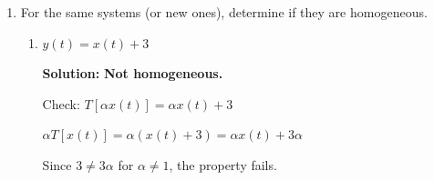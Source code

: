 \documentclass[nohyper,nobib,xcolor=dvipsnames,svgnames,x11names]{tufte-book}
\begin{document}
\begin{enumerate}
\begin{enumerate}
\textbf{Solution:} \textbf{Not additive.} 

Check: $T[x_1(t) + x_2(t)] = (x_1(t) + x_2(t)) + 3$


$T[x_1(t)] + T[x_2(t)] = (x_1(t) + 3) + (x_2(t) + 3) = x_1(t) + x_2(t) + 6$

Since $3 \neq 6$, the property fails.

\item $y(t) = t \cdot x(t)$

\textbf{Solution:} \textbf{Additive.}

Check: $T[x_1(t) + x_2(t)] = t \cdot (x_1(t) + x_2(t)) = t x_1(t) + t x_2(t)$

$T[x_1(t)] + T[x_2(t)] = t x_1(t) + t x_2(t)$

They are equal, so the system is additive.

\item  $y(t) = x(2t)$

\textbf{Solution:} \textbf{Additive.}

Check: $T[x_1(t) + x_2(t)] = (x_1 + x_2)(2t) = x_1(2t) + x_2(2t)$

$T[x_1(t)] + T[x_2(t)] = x_1(2t) + x_2(2t)$

They are equal, so the system is additive.


\item $y(t) = (x(t))^2$

\textbf{Solution:} \textbf{Not additive.}

Check: $T[x_1(t) + x_2(t)] = (x_1(t) + x_2(t))^2 = x_1^2(t) + 2x_1(t)x_2(t) + x_2^2(t)$

$T[x_1(t)] + T[x_2(t)] = x_1^2(t) + x_2^2(t)$ 

Since $2x_1(t)x_2(t) \neq 0$ in general, the property fails.


\end{enumerate}


\item For the same systems (or new ones), determine if they are homogeneous.

\begin{enumerate}

\item $y(t) = x(t) + 3$

\textbf{Solution:} \textbf{Not homogeneous.}

Check: $T[\alpha x(t)] = \alpha x(t) + 3$ 

$\alpha T[x(t)] = \alpha (x(t) + 3) = \alpha x(t) + 3\alpha$ 

Since $3 \neq 3\alpha$ for $\alpha \neq 1$, the property fails.



\end{enumerate}
\end{enumerate}
\end{document}
